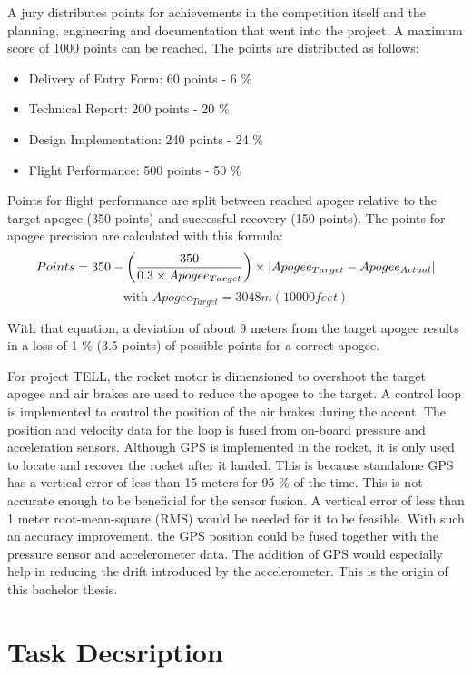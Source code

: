\vspace{0.5cm}

A jury distributes points for achievements in the competition itself and the planning, engineering and documentation that went into the project.
A maximum score of 1000 points can be reached.
The points are distributed as follows:
\begin{itemize}
 \item Delivery of Entry Form: 60 points - 6 \%
 \item Technical Report: 200 points - 20 \%
 \item Design Implementation: 240 points - 24 \%
 \item Flight Performance: 500 points - 50 \%
\end{itemize}

Points for flight performance are split between reached apogee relative to the target apogee (350 points) and successful recovery (150 points).
The points for apogee precision are calculated with this formula:
$$ Points = 350 - \left( \frac{350}{0.3 \times Apogee_{Target}} \right) \times \abs{Apogee_{Target} - Apogee_{Actual}} $$
$$ \text{with } Apogee_{Target} = 3048 m (10000 feet)$$ 

With that equation, a deviation of about 9 meters from the target apogee results in a loss of 1 \% (3.5 points) of possible points for a correct apogee. \cite{sac_rules2017}

For project TELL, the rocket motor is dimensioned to overshoot the target apogee and air brakes are used to reduce the apogee to the target.
A control loop is implemented to control the position of the air brakes during the accent.
The position and velocity data for the loop is fused from on-board pressure and acceleration sensors.
Although GPS is implemented in the rocket, it is only used to locate and recover the rocket after it landed.
This is because standalone GPS has a vertical error of less than 15 meters for 95 \% of the time. \cite{SPS_Performance}
This is not accurate enough to be beneficial for the sensor fusion.
A vertical error of less than 1 meter root-mean-square (RMS) would be needed for it to be feasible.
With such an accuracy improvement, the GPS position could be fused together with the pressure sensor and accelerometer data.
The addition of GPS would especially help in reducing the drift introduced by the accelerometer.
This is the origin of this bachelor thesis.


\section{Task Decsription}

